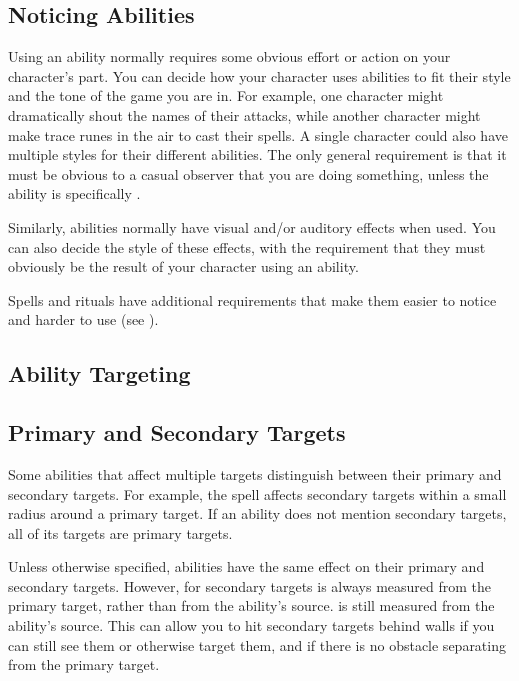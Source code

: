   \subsection{Noticing Abilities}
    Using an ability normally requires some obvious effort or action on your character's part.
    You can decide how your character uses abilities to fit their style and the tone of the game you are in.
    For example, one character might dramatically shout the names of their attacks, while another character might make trace runes in the air to cast their spells.
    A single character could also have multiple styles for their different abilities.
    The only general requirement is that it must be obvious to a casual observer that you are doing something, unless the ability is specifically .

    Similarly, abilities normally have visual and/or auditory effects when used.
    You can also decide the style of these effects, with the requirement that they must obviously be the result of your character using an ability.

    Spells and rituals have additional requirements that make them easier to notice and harder to use (see ).

  \subsection{Ability Targeting}

    \subsection{Primary and Secondary Targets}\label{Primary and Secondary Targets}
      Some abilities that affect multiple targets distinguish between their primary and secondary targets.
      For example, the  spell affects secondary targets within a small radius around a primary target.
      If an ability does not mention secondary targets, all of its targets are primary targets.

      Unless otherwise specified, abilities have the same effect on their primary and secondary targets.
      However,  for secondary targets is always measured from the primary target, rather than from the ability's source.
       is still measured from the ability's source.
      This can allow you to hit secondary targets behind walls if you can still see them or otherwise target them, and if there is no obstacle separating from the primary target.

